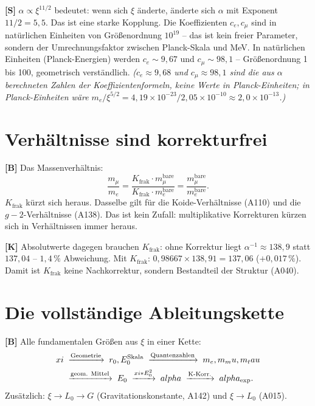 \textbf{[S]} $\alpha\propto\xi^{11/2}$ bedeutet: wenn sich $\xi$ änderte, änderte
sich $\alpha$ mit Exponent $11/2=5{,}5$. Das ist eine starke Kopplung. Die Koeffizienten
$c_e,c_\mu$ sind in natürlichen Einheiten von Größenordnung $10^{19}$ -- das ist kein
freier Parameter, sondern der Umrechnungsfaktor zwischen Planck-Skala und MeV. In
natürlichen Einheiten (Planck-Energien) werden $c_e\sim9{,}67$ und $c_\mu\sim98{,}1$ --
Größenordnung 1 bis 100, geometrisch verständlich.
\textit{($c_e\approx9{,}68$ und $c_\mu\approx98{,}1$ sind die aus $\alpha$ berechneten Zahlen der Koeffizientenformeln, keine Werte in Planck-Einheiten; in Planck-Einheiten wäre $m_e/\xi^{5/2} = 4{,}19\times10^{-23}/2{,}05\times10^{-10}\approx2{,}0\times10^{-13}$.)}

\section{Verhältnisse sind korrekturfrei}

\textbf{[B]} Das Massenverhältnis:
\[
  \frac{m_\mu}{m_e}
  = \frac{K_\text{frak}\cdot m_\mu^\text{bare}}{K_\text{frak}\cdot m_e^\text{bare}}
  = \frac{m_\mu^\text{bare}}{m_e^\text{bare}}.
\]
$K_\text{frak}$ kürzt sich heraus. Dasselbe gilt für die Koide-Verhältnisse (A110)
und die $g-2$-Verhältnisse (A138). Das ist kein Zufall: multiplikative Korrekturen
kürzen sich in Verhältnissen immer heraus.

\textbf{[K]} Absolutwerte dagegen brauchen $K_\text{frak}$: ohne Korrektur liegt
$\alpha^{-1}\approx138{,}9$ statt $137{,}04$ -- $1{,}4\,\%$ Abweichung. Mit
$K_\text{frak}$: $0{,}98667\times138{,}91 = 137{,}06$ ($+0{,}017\,\%$).
Damit ist $K_\text{frak}$ keine Nachkorrektur, sondern
Bestandteil der Struktur (A040).

\section{Die vollständige Ableitungskette}

\textbf{[B]} Alle fundamentalen Größen aus $\xi$ in einer Kette:
\begin{align}
  \xi
  &\;\xrightarrow{\text{Geometrie}}\; r_0,E_0^\text{Skala}
   \;\xrightarrow{\text{Quantenzahlen}}\; m_e,m_\mu,m_\tau \notag\\
  &\;\xrightarrow{\text{geom. Mittel}}\; E_0
   \;\xrightarrow{\xi\cdot E_0^2}\; \alpha
   \;\xrightarrow{\text{K-Korr.}}\; \alpha_\text{exp}. \notag
\end{align}
Zusätzlich: $\xi\to L_0\to G$ (Gravitationskonstante, A142) und $\xi\to L_0$ (A015).

